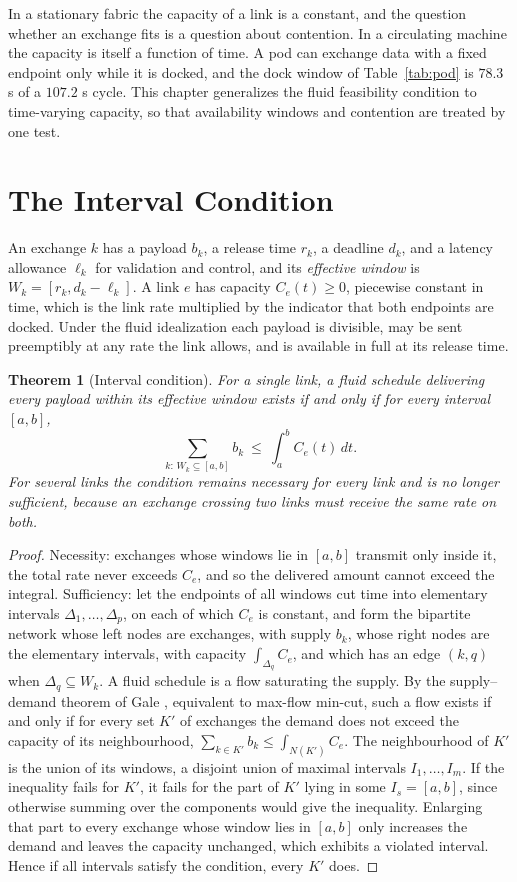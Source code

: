 \documentclass[11pt,openany]{book}
\theoremstyle{plain}
\newtheorem{theorem}{Theorem}[chapter]
\theoremstyle{definition}
\theoremstyle{remark}
\begin{document}
In a stationary fabric the capacity of a link is a constant, and the question whether an exchange fits is a question about contention. In a circulating machine the capacity is itself a function of time. A pod can exchange data with a fixed endpoint only while it is docked, and the dock window of Table~\ref{tab:pod} is $78.3$ s of a $107.2$ s cycle. This chapter generalizes the fluid feasibility condition to time-varying capacity, so that availability windows and contention are treated by one test.

\section{The Interval Condition}

An exchange $k$ has a payload $b_k$, a release time $r_k$, a deadline $d_k$, and a latency allowance $\ell_k$ for validation and control, and its \emph{effective window} is $W_k=[r_k,d_k-\ell_k]$. A link $e$ has capacity $C_e(t)\ge0$, piecewise constant in time, which is the link rate multiplied by the indicator that both endpoints are docked. Under the fluid idealization each payload is divisible, may be sent preemptibly at any rate the link allows, and is available in full at its release time.

\begin{theorem}[Interval condition]
\label{thm:interval}
For a single link, a fluid schedule delivering every payload within its effective window exists if and only if for every interval $[a,b]$,
\[
\sum_{k:\,W_k\subseteq[a,b]}b_k\ \le\ \int_a^bC_e(t)\,dt .
\]
For several links the condition remains necessary for every link and is no longer sufficient, because an exchange crossing two links must receive the same rate on both.
\end{theorem}
\begin{proof}
Necessity: exchanges whose windows lie in $[a,b]$ transmit only inside it, the total rate never exceeds $C_e$, and so the delivered amount cannot exceed the integral. Sufficiency: let the endpoints of all windows cut time into elementary intervals $\Delta_1,\dots,\Delta_p$, on each of which $C_e$ is constant, and form the bipartite network whose left nodes are exchanges, with supply $b_k$, whose right nodes are the elementary intervals, with capacity $\int_{\Delta_q}C_e$, and which has an edge $(k,q)$ when $\Delta_q\subseteq W_k$. A fluid schedule is a flow saturating the supply. By the supply--demand theorem of Gale \cite{gale}, equivalent to max-flow min-cut, such a flow exists if and only if for every set $K'$ of exchanges the demand does not exceed the capacity of its neighbourhood, $\sum_{k\in K'}b_k\le\int_{N(K')}C_e$. The neighbourhood of $K'$ is the union of its windows, a disjoint union of maximal intervals $I_1,\dots,I_m$. If the inequality fails for $K'$, it fails for the part of $K'$ lying in some $I_s=[a,b]$, since otherwise summing over the components would give the inequality. Enlarging that part to every exchange whose window lies in $[a,b]$ only increases the demand and leaves the capacity unchanged, which exhibits a violated interval. Hence if all intervals satisfy the condition, every $K'$ does.
\end{proof}
\end{document}

